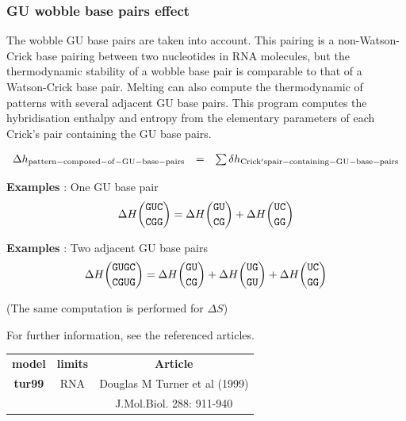 \documentclass{article}
\begin{document}
\pagebreak
\subsubsection{GU wobble base pairs effect}

The wobble GU base pairs are taken into account. This pairing is a non-Watson-Crick base pairing between two nucleotides 
in RNA molecules, but the thermodynamic stability of a wobble base pair is comparable to that of a Watson-Crick base pair.
Melting can also compute the thermodynamic of patterns with several adjacent GU base pairs.
This program computes the hybridisation enthalpy and entropy from the elementary 
parameters of each Crick's pair containing the GU base pairs.

\begin{displaymath}
  \begin{array}[t]{ccc}
  \Delta{}h_\mathrm{pattern-composed-of-GU-base-pairs}&=&\sum \delta{}h_\mathrm{Crick's pair-containing-GU-base-pairs}\\
  \end{array}
\end{displaymath}

\textbf{Examples} : One GU base pair
\begin{multline*}
\Delta H {\mbox{\texttt{GUC}} \choose \mbox{\texttt{CGG}}} = 
\Delta H {\mbox{\texttt{GU}} \choose \mbox{\texttt{CG}}} +
\Delta H {\mbox{\texttt{UC}} \choose \mbox{\texttt{GG}}}\\
\end{multline*}

\textbf{Examples} : Two adjacent GU base pairs
\begin{multline*}
\Delta H {\mbox{\texttt{GUGC}} \choose \mbox{\texttt{CGUG}}} = 
\Delta H {\mbox{\texttt{GU}} \choose \mbox{\texttt{CG}}} +
\Delta H {\mbox{\texttt{UG}} \choose \mbox{\texttt{GU}}} +
\Delta H {\mbox{\texttt{UC}} \choose \mbox{\texttt{GG}}}\\
\end{multline*}

       (The same computation is performed for $\Delta S$) 

       
For further information, see the referenced articles.

\begin{table}[h][c]
\begin{tabular}[h]{| c | c | c |}
\hline
\textbf{model} & \textbf{limits} & \textbf{Article} \\
\textbf{tur99} & RNA & Douglas M Turner et al (1999) \\
 & & J.Mol.Biol.  288: 911-940 \\
\hline
\end{tabular}
\end{table}
\end{document}
